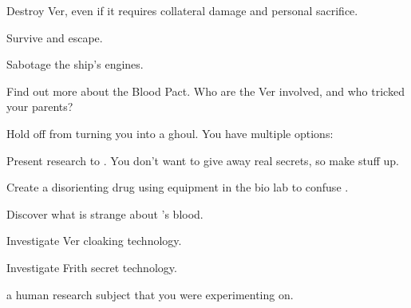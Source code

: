 \documentclass[char]{guildcamp4}
\begin{document}
\begin{itemz}[Goals]
	\item Destroy Ver, even if it requires collateral damage and personal sacrifice.
	\item Survive and escape.
	\item Sabotage the ship's engines.
	\item Find out more about the Blood Pact. Who are the Ver involved, and who tricked your parents?
	\item Hold off \cVone{} from turning you into a ghoul. You have multiple options:
    	\begin {itemz}
    	\item Present research to \cVone{}. You don't want to give away real secrets, so make stuff up.
    	\item Create a disorienting drug using equipment in the bio lab to confuse \cVone{\them}.
    	\end {itemz}
	\item Discover what is strange about \cPlead{}'s blood.
	\item Investigate Ver cloaking technology.
	\item Investigate Frith secret technology.
\end{itemz}

\begin{itemz}[Notes]
	\item 
\end{itemz}

\begin{contacts}
	\contact{\cPlead{}} a human research subject that you were experimenting on. 
\end{contacts}
\end{document}
